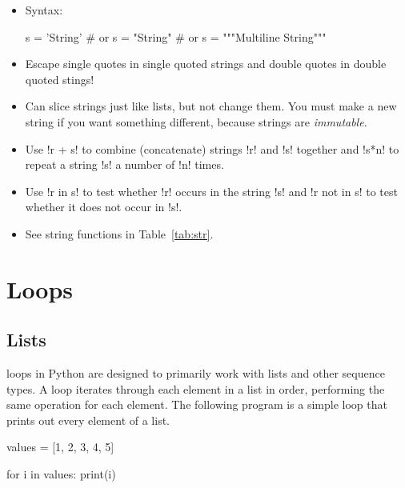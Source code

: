 \documentclass[11pt]{cselabheader}
\begin{document}
\begin{itemize}
  \item Syntax:

    \begin{python3code}
s = 'String'
# or
s = "String"
# or
s = """Multiline
String"""
    \end{python3code}

  \item Escape single quotes in single quoted strings and double quotes in
    double quoted stings!

  \item Can slice strings just like lists, but not change them. You must make a
    new string if you want something different, because strings are
    \emph{immutable}.

  \item Use \pythoninline!r + s! to combine (concatenate) strings \pythoninline!r! and
    \pythoninline!s! together and
    \pythoninline!s*n! to repeat a string \pythoninline!s! a number of \pythoninline!n!
    times.

  \item Use \pythoninline!r in s! to test whether \pythoninline!r! occurs in the
    string \pythoninline!s! and \pythoninline!r not in s! to test whether it does not
    occur in \pythoninline!s!.

  \item See string functions in Table~\ref{tab:str}.
\end{itemize}


\pagebreak
\section{\protect{} Loops}

\subsection{Lists}
 loops in Python are designed to primarily work with lists and
other sequence types. A  loop iterates through each element in
a list in order, performing the same operation for each element. The following
program is a simple  loop that prints out every element of a
list.

\begin{python3code}
values = [1, 2, 3, 4, 5]

for i in values:
    print(i)
\end{python3code}
\end{document}
